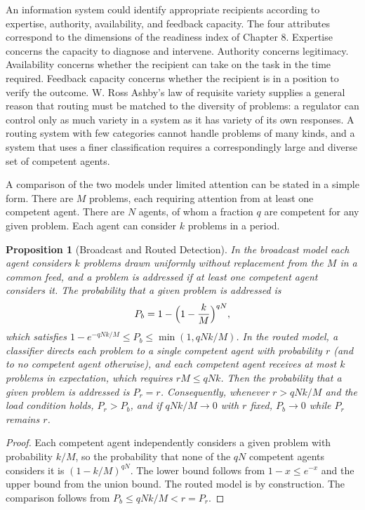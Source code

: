\documentclass[11pt]{report}
\newtheorem{proposition}[theorem]{Proposition}
\theoremstyle{definition}
\theoremstyle{remark}
\begin{document}
An information system could identify appropriate recipients according to expertise, authority, availability, and feedback capacity. The four attributes correspond to the dimensions of the readiness index of Chapter 8. Expertise concerns the capacity to diagnose and intervene. Authority concerns legitimacy. Availability concerns whether the recipient can take on the task in the time required. Feedback capacity concerns whether the recipient is in a position to verify the outcome. W. Ross Ashby's law of requisite variety \cite{ashby} supplies a general reason that routing must be matched to the diversity of problems: a regulator can control only as much variety in a system as it has variety of its own responses. A routing system with few categories cannot handle problems of many kinds, and a system that uses a finer classification requires a correspondingly large and diverse set of competent agents.

A comparison of the two models under limited attention can be stated in a simple form. There are $M$ problems, each requiring attention from at least one competent agent. There are $N$ agents, of whom a fraction $q$ are competent for any given problem. Each agent can consider $k$ problems in a period.

\begin{proposition}[Broadcast and Routed Detection]\label{prop:route}
In the broadcast model each agent considers $k$ problems drawn uniformly without replacement from the $M$ in a common feed, and a problem is addressed if at least one competent agent considers it. The probability that a given problem is addressed is
\[
P_b=1-\Bigl(1-\frac kM\Bigr)^{qN},
\]
which satisfies $1-e^{-qNk/M}\le P_b\le\min(1,qNk/M)$. In the routed model, a classifier directs each problem to a single competent agent with probability $r$ (and to no competent agent otherwise), and each competent agent receives at most $k$ problems in expectation, which requires $rM\le qNk$. Then the probability that a given problem is addressed is $P_r=r$. Consequently, whenever $r>qNk/M$ and the load condition holds, $P_r>P_b$, and if $qNk/M\to0$ with $r$ fixed, $P_b\to0$ while $P_r$ remains $r$.
\end{proposition}

\begin{proof}
Each competent agent independently considers a given problem with probability $k/M$, so the probability that none of the $qN$ competent agents considers it is $(1-k/M)^{qN}$. The lower bound follows from $1-x\le e^{-x}$ and the upper bound from the union bound. The routed model is by construction. The comparison follows from $P_b\le qNk/M<r=P_r$.
\end{proof}
\end{document}
